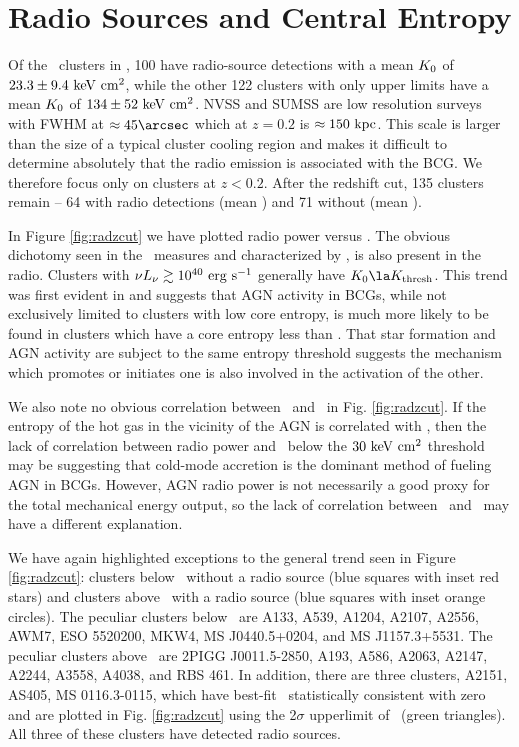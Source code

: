 \documentclass[12pt,preprint]{aastex}
\begin{document}
\section{Radio Sources and Central Entropy}
\label{sec:agn}

Of the \clnum\ clusters in \accept, 100 have radio-source detections
with a mean $K_0$ of $23.3 \pm 9.4 \mathrm{\mbox{\ensuremath{\mathrm{~keV}}} \mathrm{\mbox{\ensuremath{\mathrm{~cm}}}^2}}$, while the other 122
clusters with only upper limits have a mean $K_0$ of $134 \pm 52
\mathrm{\mbox{\ensuremath{\mathrm{~keV}}} \mathrm{\mbox{\ensuremath{\mathrm{~cm}}}^2}}$. NVSS and SUMSS are low resolution surveys with FWHM at $\approx
45\arcsec$ which at $z = 0.2$ is $\approx 150\mbox{\ensuremath{\mathrm{~kpc}}}$. This scale is
larger than the size of a typical cluster cooling region and makes it
difficult to determine absolutely that the radio emission is
associated with the BCG. We therefore focus only on clusters at $z <
0.2$. After the redshift cut, 135 clusters remain -- 64 with radio
detections (mean \frad) and 71 without (mean \nfrad).

In Figure \ref{fig:radzcut} we have plotted radio power versus \kna.
The obvious dichotomy seen in the \halpha\ measures and characterized
by \kthr, is also present in the radio. Clusters with $\nu L_{\nu} \gtrsim
10^{40} \mathrm{\mbox{\ensuremath{\mathrm{~erg}}} \mathrm{\mbox{\ensuremath{\mathrm{~s}}}^{-1}}}$ generally have $\kna \la \kthr$. This trend was first
evident in \citet{radioquiet} and suggests that AGN activity in BCGs,
while not exclusively limited to clusters with low core entropy, is
much more likely to be found in clusters which have a core entropy
less than \kthr. That star formation and AGN activity are subject to
the same entropy threshold suggests the mechanism which promotes or
initiates one is also involved in the activation of the other.

We also note no obvious correlation between \radpow\ and \kna\ in
Fig. \ref{fig:radzcut}. If the entropy of the hot gas in the vicinity
of the AGN is correlated with \kna, then the lack of correlation
between radio power and \kna\ below the $30 \mathrm{\mbox{\ensuremath{\mathrm{~keV}}} \mathrm{\mbox{\ensuremath{\mathrm{~cm}}}^2}}$ threshold may be
suggesting that cold-mode accretion \citep{pizzolato05, hardcastle07}
is the dominant method of fueling AGN in BCGs. However, AGN radio
power is not necessarily a good proxy for the total mechanical energy
output, so the lack of correlation between \radpow\ and \kna\ may have
a different explanation.

We have again highlighted exceptions to the general trend seen in
Figure \ref{fig:radzcut}: clusters below \kthr\ without a radio source
(blue squares with inset red stars) and clusters above \kthr\ with a
radio source (blue squares with inset orange circles). The peculiar
clusters below \kthr\ are A133, A539, A1204, A2107, A2556, AWM7, ESO
5520200, MKW4, MS J0440.5+0204, and MS J1157.3+5531. The peculiar
clusters above \kthr\ are 2PIGG J0011.5-2850, A193, A586, A2063,
A2147, A2244, A3558, A4038, and RBS 461. In addition, there are three
clusters, A2151, AS405, MS 0116.3-0115, which have best-fit
\kna\ statistically consistent with zero and are plotted in
Fig. \ref{fig:radzcut} using the 2$\sigma$ upperlimit of \kna\ (green
triangles). All three of these clusters have detected radio sources.
\end{document}
